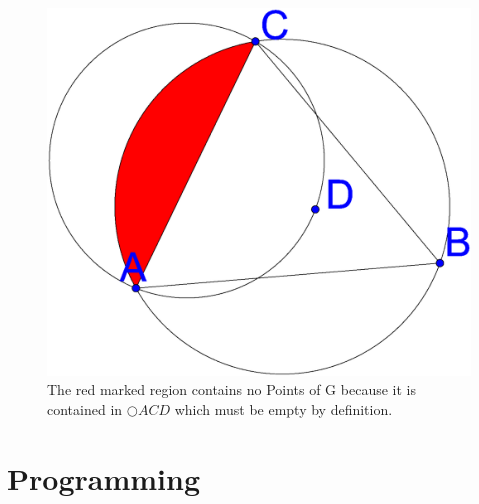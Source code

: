 \documentclass[a4paper,twoside, onecolumn]{IEEEtran}
\begin{document}
\begin{figure}[h!]
\centering
\includegraphics[width=0.2\linewidth]{noPointinRegion.eps}
\caption{The red marked region contains no Points of G because it is contained in $\bigcirc{ACD} $ which must be empty by definition.}
\label{fig:region}
\end{figure}

\section{Programming}



\end{document}
